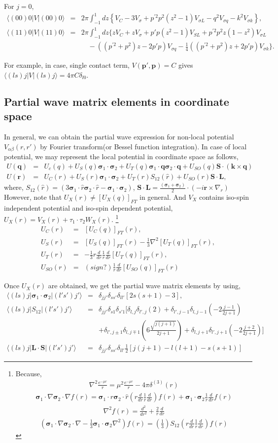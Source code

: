 \documentclass[10pt]{book}
\def\bm{\boldsymbol}
\newcommand{\bea}{\begin{eqnarray}}
\newcommand{\eea}{\end{eqnarray}}
\newcommand{\no}{\nonumber \\}
\def\vs{{\bm \sigma}}
\def\vp{{\bm p}}
\def\vq{{\bm q}}
\def\vk{{\bm k}}
\def\vr{{\bm r}}
\def\la{\langle}
\def\ra{\rangle}
\begin{document}
For $j=0$,
\bea
\la (00)0|V|(00)0\ra
&=& 2\pi\int_{-1}^1 dz\left\{
   V_C-3V_\sigma+p^{'2}p^2(z^2-1)V_{\sigma L}-q^2 V_{\sigma q}
   -k^2 V_{\sigma k}
\right\}, \no
\la (11)0|V|(11)0\ra
&=& 2\pi\int_{-1}^1 dz\Big\{
      z V_C+ z V_{\sigma}+p' p(z^2-1) V_{SL}
      +p^{'2}p^2 z(1-z^2) V_{\sigma L}
      \no & &\quad
      -((p^{'2}+p^2)z-2p'p)V_{\sigma q}
      -\frac{1}{4}((p^{'2}+p^2)z+2 p' p )V_{\sigma k}   
\Big\}.
\eea

For example, in case, single contact term,
$V(\vp',\vp)=C$ gives $\la (ls)j|V|(ls)j\ra=4\pi C \delta_{l0}$.

\subsection{Partial wave matrix elements in coordinate space}
In general, we can obtain the partial wave expression
for non-local potential $V_{\alpha\beta}(r,r')$
by Fourier transform(or Bessel function integration).
In case of local potential, we may represent the local
potential in coordinate space as follows,
\bea
U(\vq)&=&U_c(q)+U_S(q)\vs_1\cdot\vs_2
        +U_T(q)\vs_1\cdot\vq\vs_2\cdot\vq
        +U_{SO}(q){\bm S}\cdot(\vk\times\vq)\no   
U(\vr)&=&U_C(r)+U_S(r)\vs_1\cdot\vs_2
      +U_T(r)S_{12}(\hat{r})
      +U_{SO}(r){\bm S}\cdot{\bm L},
\eea
where, $S_{12}(\hat{r})=(3\vs_1\cdot\hat{r}\vs_2\cdot\hat{r}
-\vs_1\cdot\vs_2)$, 
${\bm S}\cdot{\bm L}=\frac{(\vs_1+\vs_2)}{2}\cdot(-i\vr\times\nabla_r)$
However, note that $U_X(r)\neq [U_X(q)]_{FT}$ in general.
And $V_X$ contains iso-spin independent potential
and iso-spin dependent potential, $U_X(r)=V_X(r)+\tau_1\cdot\tau_2 W_X(r)$.
\footnote{ Because,
\bea
\nabla^2\frac{e^{-\mu r}}{r}=\mu^2\frac{e^{-\mu r}}{r}-4\pi\delta^{(3)}(r)
\eea
\bea
\vs_1\cdot\nabla\vs_2\cdot\nabla f(r)
=\vs_1\cdot\hat{r}\vs_2\cdot\hat{r}(r\frac{d}{dr}\frac{1}{r}\frac{d}{dr})f(r)+\vs_1\cdot\vs_2\frac{1}{r}\frac{d}{dr}f(r)
\eea
\bea
\nabla^2f(r)=\frac{d^2}{dr^2}+\frac{2}{r}\frac{d}{dr}
\eea
\bea
(\vs_1\cdot\nabla\vs_2\cdot\nabla-\frac{1}{3}\vs_1\cdot\vs_2\nabla^2)
f(r)
=(\frac{1}{3})S_{12}(r\frac{d}{dr}\frac{1}{r}\frac{d}{dr})f(r)
\eea
}
\bea
U_C(r)&=&[U_C(q)]_{FT}(r),\no
U_S(r)&=&[U_S(q)]_{FT}(r)-\frac{1}{3}\nabla^2[U_T(q)]_{FT}(r),\no
U_T(r)&=&-\frac{1}{3}r\frac{d}{dr}\frac{1}{r}\frac{d}{dr}
          [U_T(q)]_{FT}(r),\no
U_{SO}(r)&=&(sign?)\frac{1}{r}\frac{d}{dr}[U_{SO}(q)]_{FT}(r)
\eea


Once $U_X(r)$ are obtained, we get the partial wave matrix elements by using,
\bea
\la (ls)j|\vs_1\cdot\vs_2|(l's')j'\ra&=&
\delta_{j j'}\delta_{s s'}\delta_{l l'}[2s(s+1)-3]
,\no
\la (ls)j|S_{12}|(l's')j'\ra
&=&\delta_{j j'}\delta_{s 1}\delta_{s'1} 
[\delta_{l,j}\delta_{l',j}(2)
+\delta_{l',j-1}\delta_{l,j-1}(-2\frac{j-1}{2j+1})
\no & &
+\delta_{l',j\pm 1}\delta_{l,j\mp 1}(6\frac{\sqrt{j(j+1)}}{2j+1})
+\delta_{l,j+1}\delta_{l',j+1}(-2\frac{j+2}{2j+1})
]
\no
\la (ls)j|{\bm L}\cdot{\bm S}|(l's')j'\ra
&=&\delta_{j j'}\delta_{s s'}\delta_{l l'}
   \frac{1}{2}[j(j+1)-l(l+1)-s(s+1)]
\eea 
\end{document}
